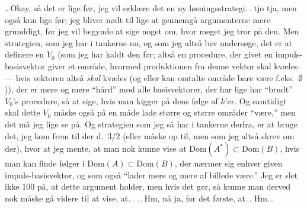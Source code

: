 \documentclass{report}
\begin{document}
\ldots Okay, så det er lige før, jeg vil erklære det en ny løsningsstrategi.\,. tjo tja, men også kun lige før; jeg bliver nødt til lige at gennemgå argumenterne mere grunddigt, før jeg vil begynde at sige noget om, hvor meget jeg tror på den. Men strategien, som jeg har i tankerne nu, og som jeg altså bør undersøge, det er at definere en $V_0$ (som jeg har kaldt den før; altså en procedure, der givet en impuls-basisvektor giver et område, hvormed produktionen fra denne vektor skal kvæles --- hvis vektoren altså \emph{skal} kvæles (og eller kan omtalte område bare være f.eks.\ $\emptyset$)), der er mere og mere ``hård'' mod alle basisvektorer, der har lige har ``brudt'' $V_0$'s procedure, så at sige, hvis man kigger på dens følge af $k$'er. Og samtidigt skal dette $V_0$ måske også på en måde lade større og større områder ``være,'' men det må jeg lige se på. Og strategien som jeg så har i tankerne derfra, er at bruge det, jeg kom frem til der d.\ 3/2 (eller måske op til, men som jeg altså skrev om der), hvor at jeg mente, at man nok kunne vise at $\mathrm{Dom}(A^*) \subset \mathrm{Dom}(B)$, hvis man kan finde følger i $\mathrm{Dom}(A) \subset \mathrm{Dom}(B)$, der nærmer sig enhver given impuls-basisvektor, og som også ``lader mere og mere af billede være.'' Jeg er slet ikke 100 på, at dette argument holder, men hvis det gør, så kunne man derved nok måske gå videre til at vise, at.\,. .\,.\,Hm, nå ja, for det første, at.\,. Hm.\,. %
\end{document}
